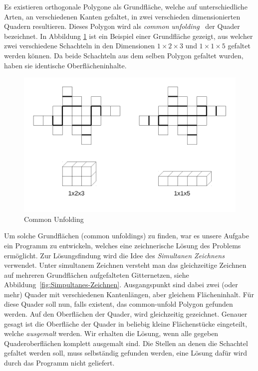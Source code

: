 Es existieren orthogonale Polygone als Grundfläche, welche auf unterschiedliche Arten, \dH an verschiedenen Kanten gefaltet, in zwei verschieden dimensionierten Quadern resultieren. Dieses Polygon wird als \emph{common unfolding}~\cite{commonUnfold} der Quader bezeichnet. In Abbildung \ref{fig:Common-Unfolding} ist ein Beispiel einer Grundfläche gezeigt, aus welcher zwei verschiedene Schachteln in den Dimensionen $1\times2\times3$ und $1\times1\times5$ gefaltet werden können. Da beide Schachteln aus dem selben Polygon gefaltet wurden, haben sie identische Oberflächeninhalte.

\begin{figure}[htbp]
\centering
\includegraphics[scale=0.5]{03_pics/commonUnfold_beispiel1.pdf}
\caption{Common Unfolding}
\label{fig:Common-Unfolding}
\end{figure}

Um solche Grundflächen (common unfoldings) zu finden, war es unsere Aufgabe ein Programm zu entwickeln, welches eine zeichnerische Lösung des Problems ermöglicht. Zur Lösungsfindung wird die Idee des \emph{Simultanen Zeichnens} verwendet. Unter simultanem Zeichnen versteht man das gleichzeitige Zeichnen auf mehreren Grundflächen \bzw aufgefalteten Gitternetzen, siehe Abbildung~\ref{fig:Simpultanes-Zeichnen}. Ausgangspunkt sind dabei zwei (oder mehr) Quader mit verschiedenen Kantenlängen, aber gleichem Flächeninhalt. Für diese Quader soll nun, falls existent, das common-unfold Polygon gefunden werden. Auf den Oberflächen der Quader, wird gleichzeitig gezeichnet. Genauer gesagt ist die Oberfläche der Quader in beliebig kleine Flächenstücke eingeteilt, welche \emph{ausgemalt} werden. Wir erhalten die Lösung, wenn alle gegeben Quaderoberflächen komplett ausgemalt sind. Die Stellen an denen die Schachtel gefaltet werden soll, muss selbständig gefunden werden, eine Lösung dafür wird durch das Programm nicht geliefert. 


